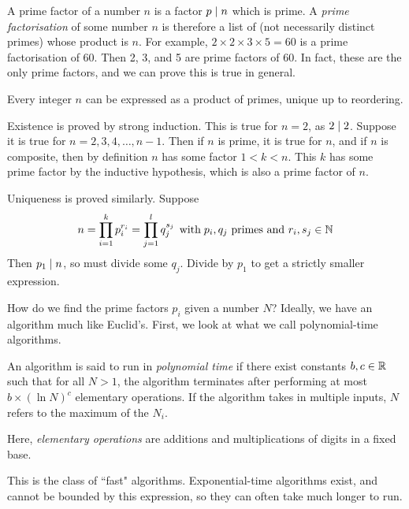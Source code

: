 \documentclass{article}
\begin{document}
A prime factor of a number $n$ is a factor $p \mid n$ which is prime.
A \textit{prime factorisation} of some number $n$ is therefore a list of (not necessarily distinct primes) whose product is $n$.
For example, $2 \times 2 \times 3 \times 5 = 60$ is a prime factorisation of 60.
Then 2, 3, and 5 are prime factors of 60. In fact, these are the only prime factors, and we can prove this is true in general.

\begin{theorem}
	Every integer $n$ can be expressed as a product of primes, unique up to reordering.
\end{theorem}

\begin{prf}
	Existence is proved by strong induction.
	This is true for $n = 2$, as $2 \mid 2$.
	Suppose it is true for $n = 2, 3, 4, \ldots, n-1$.
	Then if $n$ is prime, it is true for $n$, and if $n$ is composite, then by definition $n$ has some factor $1 < k < n$.
	This $k$ has some prime factor by the inductive hypothesis, which is also a prime factor of $n$.
	
	Uniqueness is proved similarly. Suppose
	\[
	n = \prod_{i=1}^k p_i^{r_i} = \prod_{j=1}^l q_j^{s_j} \mathrel{\, \text{with}} p_i, q_j \text{ primes and } r_i, s_j \in \mathbb{N}
	\]
	Then $p_1 \mid n$, so must divide some $q_j$.
	Divide by $p_1$ to get a strictly smaller expression.
\end{prf}

How do we find the prime factors $p_i$ given a number $N$? Ideally, we have an algorithm  much like Euclid's. First, we look at what we call polynomial-time algorithms.

\begin{definition}
	An algorithm is said to run in \textit{polynomial time} if there exist constants $b, c \in \mathbb{R}$ such that for all $N > 1$, the algorithm terminates after performing at most $b  \times ( \ln N)^c$ elementary operations. If the algorithm takes in multiple inputs, $N$ refers to the maximum of the $N_i$.

	Here, \textit{elementary operations} are additions and multiplications of digits in a fixed base.
\end{definition}

\begin{note}
	This is the class of ``fast" algorithms. Exponential-time algorithms exist, and cannot be bounded by this expression, so they can often take much longer to run.
\end{note}
\end{document}
